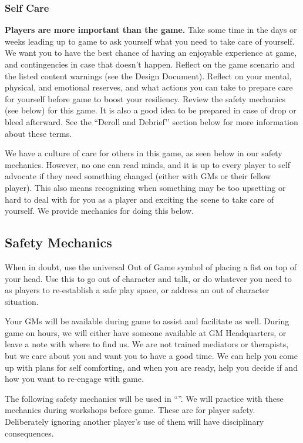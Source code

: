 \documentclass[sheet]{GL2020}
\begin{document}
\subsubsection{Self Care}
\textbf{Players are more important than the game.} Take some time in the days or weeks leading up to game to ask yourself what you need to take care of yourself. We want you to have the best chance of having an enjoyable experience at game, and contingencies in case that doesn't happen. Reflect on the game scenario and the listed content warnings (see the Design Document). Reflect on your mental, physical, and emotional reserves, and what actions you can take to prepare care for yourself before game to boost your resiliency. Review the safety mechanics (see below) for this game. It is also a good idea to be prepared in case of drop or bleed afterward. See the ``Deroll and Debrief'’ section below for more information about these terms.

We have a culture of care for others in this game, as seen below in our safety mechanics. However, no one can read minds, and it is up to every player to self advocate if they need something changed (either with GMs or their fellow player). This also means recognizing when something may be too upsetting or hard to deal with for you as a player and exciting the scene to take care of yourself. We provide mechanics for doing this below.  

\subsection{Safety Mechanics}
When in doubt, use the universal Out of Game symbol of placing a fist on top of your head. Use this to go out of character and talk, or do whatever you need to as players to re-establish a safe play space, or address an out of character situation. 

Your GMs will be available during game to assist and facilitate as well. During game on hours, we will either have someone available at GM Headquarters, or leave a note with where to find us. We are not trained mediators or therapists, but we care about you and want you to have a good time. We can help you come up with plans for self comforting, and when you are ready, help you decide if and how you want to re-engage with game.

The following safety mechanics will be used in ``\gamename{}''. We will practice with these mechanics during workshops before game. These are for player safety. Deliberately ignoring another player's use of them will have disciplinary consequences.
\end{document}
